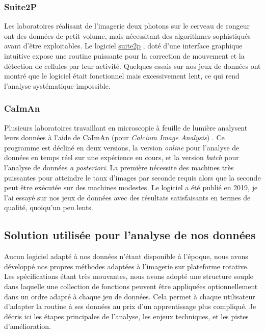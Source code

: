 \subsubsection{Suite2P}

Les laboratoires réalisant de l'imagerie deux photons sur le cerveau de rongeur ont des données de petit volume, mais nécessitant des algorithmes sophistiqués avant d'être exploitables. Le logiciel \href{https://www.suite2p.org/}{suite2p} \cite{pachitariu_suite2p_2016}, doté d'une interface graphique intuitive expose une routine puissante pour la correction de mouvement et la détection de cellules par leur activité. Quelques essais sur nos jeux de données ont montré que le logiciel était fonctionnel mais excessivement lent, ce qui rend l'analyse systématique impossible.

\subsubsection{CaImAn}

Plusieurs laboratoires travaillant en microscopie à feuille de lumière analysent leurs données à l'aide de \href{https://github.com/flatironinstitute/CaImAn}{CaImAn} (pour \emph{Calcium Image Analysis}) \cite{giovannucci_caiman_2019}. Ce programme est décliné en deux versions, la version \emph{online} pour l'analyse de données en temps réel sur une expérience en cours, et la version \emph{batch} pour l'analyse de données \emph{a posteriori}. La première nécessite des machines très puissantes pour atteindre le taux d'images par seconde requis alors que la seconde peut être exécutée sur des machines modestes. Le logiciel a été publié en 2019, je l'ai essayé sur nos jeux de données avec des résultats satisfaisants en termes de qualité, quoiqu'un peu lents.

\subsection{Solution utilisée pour l'analyse de nos données}


Aucun logiciel adapté à nos données n'étant disponible à l'époque, nous avons développé nos propres méthodes adaptées à l'imagerie sur plateforme rotative. Les spécifications étant très mouvantes, nous avons adopté une structure souple dans laquelle une collection de fonctions peuvent être appliquées optionnellement dans un ordre adapté à chaque jeu de données. Cela permet à chaque utilisateur d'adapter la routine à ses données au prix d'un apprentissage plus compliqué. Je décris ici les étapes principales de l'analyse, les enjeux techniques, et les pistes d'amélioration.

